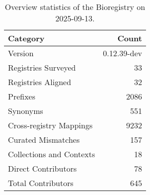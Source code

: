 \begin{table}
\caption{Overview statistics of the Bioregistry on 2025-09-13.}
\label{tab:bioregistry-summary}
\begin{tabular}{lr}
\toprule
Category & Count \\
\midrule
Version & 0.12.39-dev \\
Registries Surveyed & 33 \\
Registries Aligned & 32 \\
Prefixes & 2086 \\
Synonyms & 551 \\
Cross-registry Mappings & 9232 \\
Curated Mismatches & 157 \\
Collections and Contexts & 18 \\
Direct Contributors & 78 \\
Total Contributors & 645 \\
\bottomrule
\end{tabular}
\end{table}
